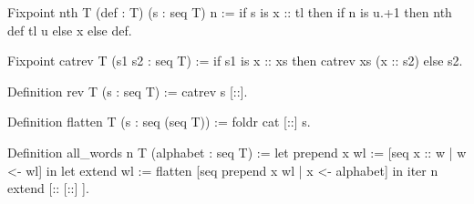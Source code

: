 \begin{Answer}[ref=ex:nth]

\begin{coq}{}{}
Fixpoint nth T (def : T) (s : seq T) n :=
  if s is x :: tl then if n is u.+1 then nth def tl u else x else def.
\end{coq}

\end{Answer}

\begin{Answer}[ref=ex:rev]

\begin{coq}{}{}
Fixpoint catrev T (s1 s2 : seq T) :=
  if s1 is x :: xs then catrev xs (x :: s2) else s2.

Definition rev T (s : seq T) := catrev s [::].
\end{coq}

\end{Answer}


\begin{Answer}[ref=ex:flatten]

\begin{coq}{}{}
Definition flatten T (s : seq (seq T)) := foldr cat [::] s.
\end{coq}

\end{Answer}

\begin{Answer}[ref=ex:allwords]

\begin{coq}{}{}
Definition all_words n T (alphabet : seq T) :=
  let prepend x wl := [seq x :: w | w <- wl] in
  let extend wl := flatten [seq prepend x wl | x <- alphabet] in
  iter n extend [:: [::] ].
\end{coq}

\end{Answer}




